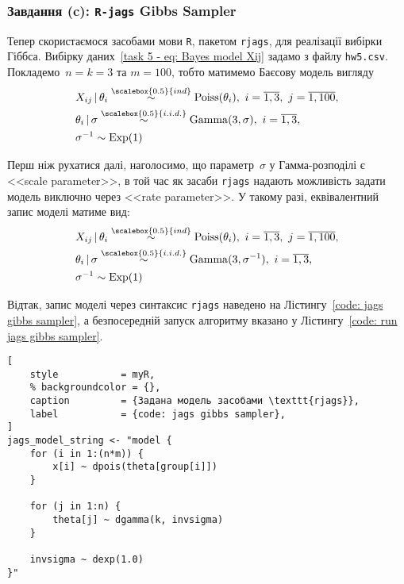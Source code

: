 \subsubsection*{Завдання (c): \texttt{R-jags} Gibbs Sampler}

Тепер скористаємося засобами мови \texttt{R}, пакетом \texttt{rjags}, для реалізації вибірки Гіббса. Вибірку даних~\eqref{task 5 - eq: Bayes model Xij} задамо з файлу \texttt{hw5.csv}. Покладемо~$n=k=3$ та $m=100$, тобто матимемо Баєсову модель вигляду
\begin{align}
    & X_{ij} \,|\, \theta_i \overset{\scalebox{0.5}{ind}}{\sim} \mathrm{Poiss}(\theta_i),\ i=\overline{1,3},\ j=\overline{1,100}, \\
    & \theta_i \,|\, \sigma \overset{\scalebox{0.5}{i.i.d.}}{\sim} \mathrm{Gamma}(3,\sigma),\ i=\overline{1,3}, \\
    & \sigma^{-1} \sim \mathrm{Exp}(1)
\end{align}

Перш ніж рухатися далі, наголосимо, що параметр~$\sigma$ у Гамма-розподілі є <<scale parameter>>, в той час як засаби \texttt{rjags} надають можливість задати модель виключно через <<rate parameter>>. У такому разі, еквівалентний запис моделі матиме вид:
\begin{align}
    & X_{ij} \,|\, \theta_i \overset{\scalebox{0.5}{ind}}{\sim} \mathrm{Poiss}(\theta_i),\ i=\overline{1,3},\ j=\overline{1,100}, \\
    & \theta_i \,|\, \sigma \overset{\scalebox{0.5}{i.i.d.}}{\sim} \mathrm{Gamma}(3,\sigma^{-1}),\ i=\overline{1,3}, \\
    & \sigma^{-1} \sim \mathrm{Exp}(1)
\end{align}

Відтак, запис моделі через синтаксис \texttt{rjags} наведено на Лістингу~\ref{code: jags gibbs sampler}, а безпосередній запуск алгоритму вказано у Лістингу~\ref{code: run jags gibbs sampler}.

\vspace{0.4cm}
\begin{lstlisting}[
    style           = myR, 
    % backgroundcolor = {},
    caption         = {Задана модель засобами \texttt{rjags}},
    label           = {code: jags gibbs sampler},
]
jags_model_string <- "model {
    for (i in 1:(n*m)) {
        x[i] ~ dpois(theta[group[i]])
    }

    for (j in 1:n) {
        theta[j] ~ dgamma(k, invsigma)
    }

    invsigma ~ dexp(1.0)
}"
\end{lstlisting}

